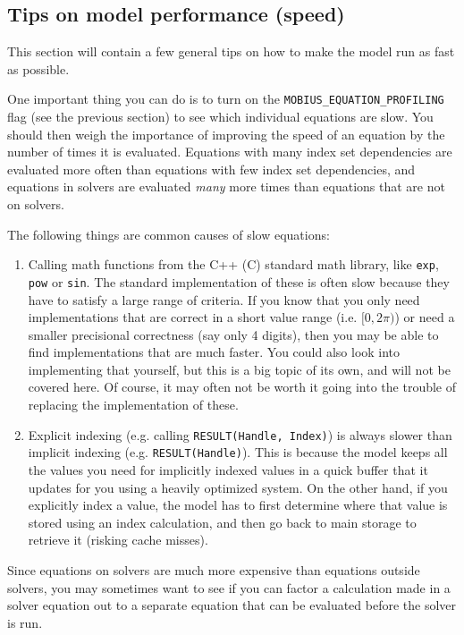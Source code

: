 \documentclass[11pt]{article}
\theoremstyle{definition}
\begin{document}
\subsection{Tips on model performance (speed)}\label{sec:performance}

This section will contain a few general tips on how to make the model run as fast as possible.

One important thing you can do is to turn on the {\tt MOBIUS\_EQUATION\_PROFILING} flag (see the previous section) to see which individual equations are slow. You should then weigh the importance of improving the speed of an equation by the number of times it is evaluated. Equations with many index set dependencies are evaluated more often than equations with few index set dependencies, and equations in solvers are evaluated \emph{many} more times than equations that are not on solvers.

The following things are common causes of slow equations:
\begin{enumerate}[i]
\item Calling math functions from the C++ (C) standard math library, like {\tt exp}, {\tt pow} or {\tt sin}. The standard implementation of these is often slow because they have to satisfy a large range of criteria. If you know that you only need implementations that are correct in a short value range (i.e. $[0, 2\pi)$) or need a smaller precisional correctness (say only 4 digits), then you may be able to find implementations that are much faster. You could also look into implementing that yourself, but this is a big topic of its own, and will not be covered here. Of course, it may often not be worth it going into the trouble of replacing the implementation of these.
\item Explicit indexing (e.g. calling {\tt RESULT(Handle, Index)}) is always slower than implicit indexing (e.g. {\tt RESULT(Handle)}). This is because the model keeps all the values you need for implicitly indexed values in a quick buffer that it updates for you using a heavily optimized system. On the other hand, if you explicitly index a value, the model has to first determine where that value is stored using an index calculation, and then go back to main storage to retrieve it (risking cache misses).
\end{enumerate}

Since equations on solvers are much more expensive than equations outside solvers, you may sometimes want to see if you can factor a calculation made in a solver equation out to a separate equation that can be evaluated before the solver is run.
\end{document}
